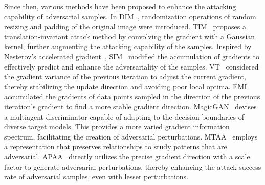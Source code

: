 
Since then, various methods have been proposed to enhance the attacking capability of adversarial samples. In DIM~\cite{xie2019improving}, randomization operations of random resizing and padding of the original image were introduced. TIM~\cite{dong2019evading} proposes a translation-invariant attack method by convolving the gradient with a Gaussian kernel, further augmenting the attacking capability of the samples. Inspired by Nesterov's accelerated gradient~\cite{nesterov1983method}, SIM~\cite{lin2019nesterov} modified the accumulation of gradients to effectively predict and enhance the adversariality of the samples. VT~\cite{wang2021enhancing} considered the gradient variance of the previous iteration to adjust the current gradient, thereby stabilizing the update direction and avoiding poor local optima. EMI~\cite{wang2021boosting} accumulated the gradients of data points sampled in the direction of the previous iteration's gradient to find a more stable gradient direction.
MagicGAN~\cite{chen2022magicgan} devises a multiagent discriminator capable of adapting to the decision boundaries of diverse target models. This provides a more varied gradient information spectrum, facilitating the creation of adversarial perturbations. MTAA~\cite{chen2023learning} employs a representation that preserves relationships to study patterns that are adversarial. APAA~\cite{yuan2024adaptive} directly utilizes the precise gradient direction with a scale factor to generate adversarial perturbations, thereby enhancing the attack success rate of adversarial samples, even with lesser perturbations.

